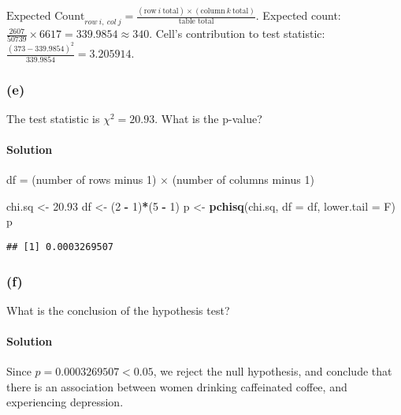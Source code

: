 \documentclass[]{article}
\newenvironment{Shaded}{\begin{snugshade}}{\end{snugshade}}
\newcommand{\KeywordTok}[1]{\textcolor[rgb]{0.13,0.29,0.53}{\textbf{#1}}}
\newcommand{\DataTypeTok}[1]{\textcolor[rgb]{0.13,0.29,0.53}{#1}}
\newcommand{\DecValTok}[1]{\textcolor[rgb]{0.00,0.00,0.81}{#1}}
\newcommand{\FloatTok}[1]{\textcolor[rgb]{0.00,0.00,0.81}{#1}}
\newcommand{\StringTok}[1]{\textcolor[rgb]{0.31,0.60,0.02}{#1}}
\newcommand{\OperatorTok}[1]{\textcolor[rgb]{0.81,0.36,0.00}{\textbf{#1}}}
\newcommand{\NormalTok}[1]{#1}
\let\oldparagraph\paragraph
\renewcommand{\paragraph}[1]{\oldparagraph{#1}\mbox{}}
\begin{document}
\(\text{Expected Count}_{row \ i,\ col \ j} = \frac{(\text{row}\ i \ \text{total}) \times (\text{column}\ k \ \text{total})}{\text{table total}}\).
Expected count:
\(\frac{2607}{50739} \times 6617 = 339.9854 \approx 340\). Cell's
contribution to test statistic:
\(\frac{(373 - 339.9854)^2}{339.9854} = 3.205914\).

\subsubsection{(e)}\label{e}

The test statistic is \(\chi^2 = 20.93\). What is the p-value?

\paragraph{Solution}\label{solution-18}

df = (number of rows minus 1) \(\times\) (number of columns minus 1)

\begin{Shaded}
\begin{Highlighting}[]
\NormalTok{chi.sq <-}\StringTok{ }\FloatTok{20.93}
\NormalTok{df <-}\StringTok{ }\NormalTok{(}\DecValTok{2} \OperatorTok{-}\StringTok{ }\DecValTok{1}\NormalTok{)}\OperatorTok{*}\NormalTok{(}\DecValTok{5} \OperatorTok{-}\StringTok{ }\DecValTok{1}\NormalTok{)}
\NormalTok{p <-}\StringTok{ }\KeywordTok{pchisq}\NormalTok{(chi.sq, }\DataTypeTok{df =}\NormalTok{ df, }\DataTypeTok{lower.tail =}\NormalTok{ F)}
\NormalTok{p}
\end{Highlighting}
\end{Shaded}

\begin{verbatim}
## [1] 0.0003269507
\end{verbatim}

\subsubsection{(f)}\label{f}

What is the conclusion of the hypothesis test?

\paragraph{Solution}\label{solution-19}

Since \(p = 0.0003269507 < 0.05\), we reject the null hypothesis, and
conclude that there is an association between women drinking caffeinated
coffee, and experiencing depression.
\end{document}
